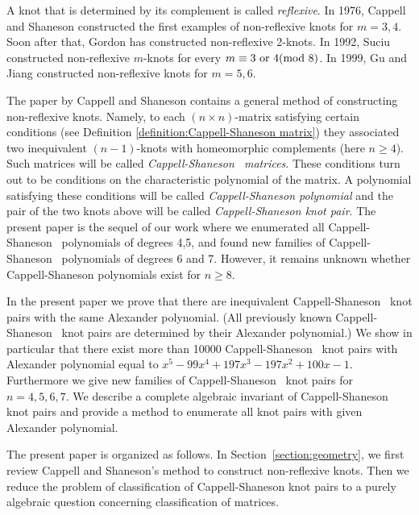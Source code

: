 \documentclass[12pt]{amsart}
\newcommand{\bc}{}
\newcommand{\cskp}{Cappell-Shaneson knot pair}
\newcommand{\csss}{Cappell-Shaneson~ }
\theoremstyle{plain}
\theoremstyle{definition}
\theoremstyle{remark}
\renewcommand{\geq}{\geqslant}
\renewcommand{\(}{\big(}
\renewcommand{\)}{\big)}
\theoremstyle{plain}
\theoremstyle{definition}
\begin{document}
 A knot that is determined by its complement is called { \it reflexive}. In 1976, Cappell and Shaneson \cite{Cappell-Shaneson:1976-1} constructed the first examples of non-reflexive knots for $m=3,4$.
Soon after that, Gordon \cite{Gordon:1976} has constructed non-reflexive 2-knots.
In 1992, {\bc  Suciu } \cite{Suciu:1992} constructed
non-reflexive $m$-knots for every $m \equiv 3 {\rm \ or\ } 4  ({\rm mod} \ 8)$.
 In 1999, Gu and Jiang \cite{Gu-Jiang} constructed non-reflexive knots for $m=5,6$.


 {\bc
 The paper  \cite{Cappell-Shaneson:1976-1} by Cappell and Shaneson contains  a general method of constructing non-reflexive knots. Namely,
 to each $(n\times n)$-matrix  satisfying certain conditions
 (see Definition \ref{definition:Cappell-Shaneson matrix})
  they associated two inequivalent $(n-1)$-knots with homeomorphic complements (here $n\geq 4$). Such matrices will be called
  {\it \csss matrices}. These conditions turn out to be
 conditions on the characteristic polynomial of the matrix.
 A polynomial satisfying these conditions will be called
 {\it  Cappell-Shaneson  polynomial} and the pair of the two knots above will be called  {\it Cappell-Shaneson knot pair}. The present paper is the sequel
 of our work \cite{Endo-Iwaki-Pajitnov:2025} where we enumerated all
 \csss  polynomials  of degrees 4,5, and found new families of \csss polynomials
 of degrees 6 and 7.
}
However, it remains unknown whether Cappell-Shaneson polynomials exist for $n \ge 8$.

{\bc
In the present paper we prove that there are inequivalent \csss knot pairs with the same Alexander polynomial. (All previously known \csss knot pairs are determined by their Alexander polynomial.) We show in particular that there exist more than 10000 \csss knot pairs with Alexander polynomial equal to $x^5-99x^4+197x^3-197x^2+100x-1$. Furthermore we give new families of  \csss knot pairs for $n=4,5,6,7$. We describe  a complete algebraic invariant of Cappell-Shaneson knot pairs and provide a method to enumerate all knot pairs with given Alexander polynomial.
}

The present paper is organized as follows. In Section~\ref{section:geometry}, we first review Cappell and Shaneson's method to construct non-reflexive knots.
{\bc
Then we reduce the problem of classification of
\cskp s to a purely algebraic question concerning
classification of matrices.
 }
\end{document}
